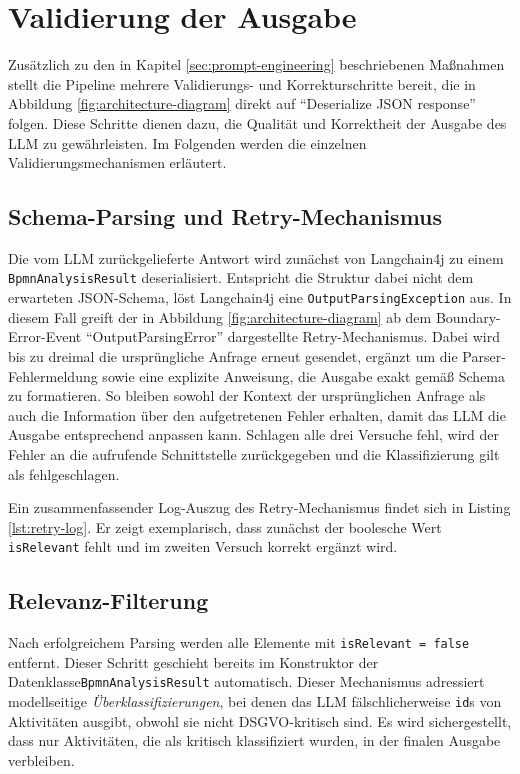 \section{Validierung der Ausgabe}\label{sec:validierung-der-ausgabe}

Zusätzlich zu den in Kapitel \ref{sec:prompt-engineering} beschriebenen Maßnahmen stellt die Pipeline mehrere Validierungs- und Korrekturschritte bereit, die in Abbildung \ref{fig:architecture-diagram} direkt auf \enquote{Deserialize JSON response} folgen. Diese Schritte dienen dazu, die Qualität und Korrektheit der Ausgabe des \ac{LLM} zu gewährleisten. Im Folgenden werden die einzelnen Validierungsmechanismen erläutert.

\subsection*{Schema-Parsing und Retry-Mechanismus}

Die vom \ac{LLM} zurückgelieferte Antwort wird zunächst von Langchain4j zu einem \texttt{BpmnAnalysisResult} deserialisiert. Entspricht die Struktur dabei nicht dem erwarteten JSON-Schema, löst Langchain4j eine \texttt{OutputParsingException} aus. In diesem Fall greift der in Abbildung \ref{fig:architecture-diagram} ab dem Boundary-Error-Event \enquote{OutputParsingError} dargestellte Retry-Mechanismus. Dabei wird bis zu dreimal die ursprüngliche Anfrage erneut gesendet, ergänzt um die Parser-Fehlermeldung sowie eine explizite Anweisung, die Ausgabe exakt gemäß Schema zu formatieren. So bleiben sowohl der Kontext der ursprünglichen Anfrage als auch die Information über den aufgetretenen Fehler erhalten, damit das \ac{LLM} die Ausgabe entsprechend anpassen kann. Schlagen alle drei Versuche fehl, wird der Fehler an die aufrufende Schnittstelle zurückgegeben und die Klassifizierung gilt als fehlgeschlagen.

Ein zusammenfassender Log-Auszug des Retry-Mechanismus findet sich in Listing \ref{lst:retry-log}. Er zeigt exemplarisch, dass zunächst der boolesche Wert \texttt{isRelevant} fehlt und im zweiten Versuch korrekt ergänzt wird.

\subsection*{Relevanz-Filterung}

Nach erfolgreichem Parsing werden alle Elemente mit \texttt{isRelevant = false} entfernt. Dieser Schritt geschieht bereits im Konstruktor der Datenklasse\break\texttt{BpmnAnalysisResult} automatisch. Dieser Mechanismus adressiert modellseitige \emph{Überklassifizierungen}, bei denen das \ac{LLM} fälschlicherweise \texttt{id}s von Aktivitäten ausgibt, obwohl sie nicht \ac{DSGVO}-kritisch sind. Es wird sichergestellt, dass nur Aktivitäten, die als kritisch klassifiziert wurden, in der finalen Ausgabe verbleiben.

